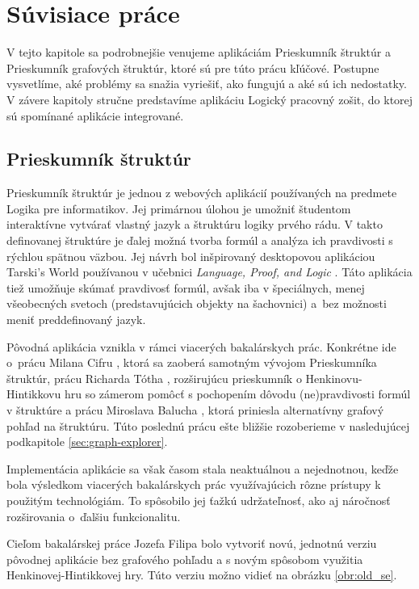 \chapter{Súvisiace práce}

\label{kap:suvisiace_prace} %

V tejto kapitole sa podrobnejšie venujeme aplikáciám Prieskumník štruktúr a Prieskumník grafových štruktúr, ktoré sú pre túto prácu kľúčové. Postupne vysvetlíme, aké problémy sa snažia vyriešiť, ako fungujú a aké sú ich nedostatky. V závere kapitoly stručne predstavíme aplikáciu Logický pracovný zošit, do ktorej sú spomínané aplikácie integrované.

\section{Prieskumník štruktúr}
\label{sec:explorer}

Prieskumník štruktúr je jednou z webových aplikácií používaných na predmete Logika pre informatikov. Jej primárnou úlohou je umožniť študentom interaktívne vytvárať vlastný jazyk a štruktúru logiky prvého rádu. V takto definovanej štruktúre je ďalej možná tvorba formúl a analýza ich pravdivosti s rýchlou spätnou väzbou. Jej návrh bol inšpirovaný desktopovou aplikáciou Tarski's World \cite{tarksi} používanou v učebnici \textit{Language, Proof, and Logic} \cite{lpl}. Táto aplikácia tiež umožňuje skúmať pravdivosť formúl, avšak iba v špeciálnych, menej všeobecných svetoch (predstavujúcich objekty na šachovnici) a~bez možnosti meniť preddefinovaný jazyk.

Pôvodná aplikácia vznikla v rámci viacerých bakalárskych prác. Konkrétne ide o~prácu Milana Cifru \cite{cifra2018}, ktorá sa zaoberá samotným vývojom Prieskumníka štruktúr, prácu Richarda Tótha \cite{toth2021}, rozširujúcu prieskumník o Henkinovu-Hintikkovu hru so zámerom pomôcť s pochopením dôvodu (ne)pravdivosti formúl v štruktúre a prácu Miroslava Balucha \cite{baluch2020}, ktorá priniesla alternatívny grafový pohľad na štruktúru. Túto poslednú prácu ešte bližšie rozoberieme v nasledujúcej podkapitole \ref{sec:graph-explorer}.

Implementácia aplikácie sa však časom stala neaktuálnou a nejednotnou, keďže bola výsledkom viacerých bakalárskych prác využívajúcich rôzne prístupy k použitým technológiám. To spôsobilo jej ťažkú udržateľnosť, ako aj náročnosť rozširovania o~ďalšiu funkcionalitu.

Cieľom bakalárskej práce Jozefa Filipa \cite{filip2025} bolo vytvoriť novú, jednotnú verziu pôvodnej aplikácie bez grafového pohľadu a s novým spôsobom využitia Henkinovej-Hintikkovej hry. Túto verziu možno vidieť na obrázku \ref{obr:old_se}.

